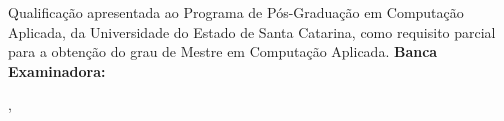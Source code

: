 \begin{folhadeaprovacao}

	\begin{center}
		{\ABNTEXchapterfont\bfseries\imprimirautor}
		\vspace{6em}

			\ABNTEXchapterfont\bfseries\imprimirtitulo

	\end{center}
		\vspace{1em}
		{\justify
    Qualificação apresentada ao Programa de Pós-Graduação em Computação Aplicada, da Universidade do Estado de Santa
    Catarina, como requisito parcial para a obtenção do grau de Mestre em Computação Aplicada.}
	\vspace{3em}
	\noindent
	{\bfseries Banca Examinadora:}

    \vspace*{\fill}
    \begin{center}
    	\imprimirlocal,\,\imprimirfulldata
    \end{center}
\end{folhadeaprovacao}




